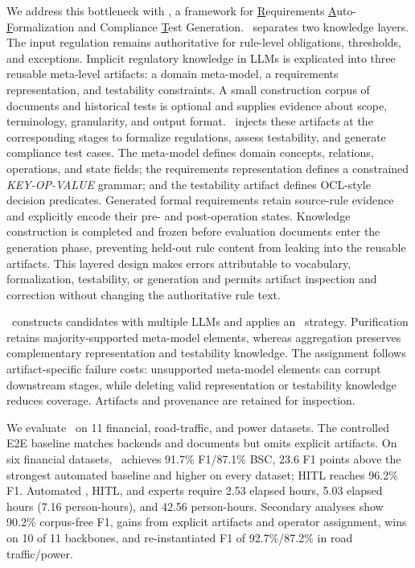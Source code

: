 We address this bottleneck with \ourtool, a framework for
\underline{R}equirements \underline{A}uto-\underline{F}ormalization and
Compliance \underline{T}est Generation. \ourtool\ separates two knowledge
layers. The input regulation remains authoritative for rule-level obligations,
thresholds, and exceptions. Implicit regulatory knowledge in LLMs is explicated
into three reusable meta-level artifacts: a domain meta-model, a requirements
representation, and testability constraints. A small construction
corpus of documents and historical tests is optional and supplies evidence
about scope, terminology, granularity, and output format. \ourtool\ injects
these artifacts at the corresponding stages to formalize regulations, assess
testability, and generate compliance test cases. The meta-model
defines domain concepts, relations, operations, and state fields; the
requirements representation defines a constrained \textit{KEY-OP-VALUE}
grammar; and the testability artifact defines OCL-style decision predicates.
Generated formal requirements retain source-rule evidence and explicitly
encode their pre- and post-operation states. Knowledge construction is
completed and frozen before evaluation documents enter the generation phase,
preventing held-out rule content from leaking into the reusable artifacts.
This layered design makes errors attributable to vocabulary, formalization,
testability, or generation and permits artifact inspection and correction
without changing the authoritative rule text.

\ourtool\ constructs candidates with multiple LLMs and applies an \strategy\
strategy. Purification retains majority-supported meta-model elements, whereas
aggregation preserves complementary representation and testability knowledge.
The assignment follows artifact-specific failure costs: unsupported meta-model
elements can corrupt downstream stages, while deleting valid representation or
testability knowledge reduces coverage. Artifacts and provenance are retained
for inspection.

We evaluate \ourtool\ on 11 financial, road-traffic, and power datasets. The
controlled E2E baseline matches backends and documents but omits explicit
artifacts. On six financial datasets, \ourtool\ achieves 91.7\% F1/87.1\% BSC,
23.6 F1 points above the strongest automated baseline and higher on every
dataset; HITL reaches 96.2\% F1. Automated \ourtool, HITL, and experts require
2.53 elapsed hours, 5.03 elapsed hours (7.16 person-hours), and 42.56
person-hours. Secondary analyses show 90.2\% corpus-free F1, gains from explicit
artifacts and operator assignment, wins on 10 of 11 backbones, and
re-instantiated F1 of 92.7\%/87.2\% in road traffic/power.

